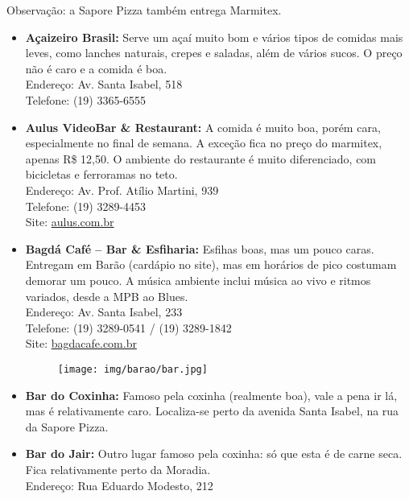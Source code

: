 Observação: a Sapore Pizza também entrega Marmitex.


%
%

\begin{itemize}
    \item   \textbf{Açaizeiro Brasil:} Serve um açaí muito bom e vários tipos de
        comidas mais leves, como lanches naturais, crepes e saladas, além de
        vários sucos. O preço não é caro e a comida é boa.
        \\Endereço: Av. Santa Isabel, 518
        \\Telefone: (19) 3365-6555 %

    \item   \textbf{Aulus VideoBar \& Restaurant:} A comida é muito boa, porém
        cara, especialmente no final de semana. A exceção fica no preço do
        marmitex, apenas R\$ 12,50. O ambiente do restaurante é muito diferenciado,
        com bicicletas e ferroramas no teto.
        \\Endereço: Av. Prof. Atílio Martini, 939
        \\Telefone: (19) 3289-4453
        \\Site: \url{aulus.com.br}

    \item   \textbf{Bagdá Café -- Bar \& Esfiharia:} Esfihas boas, mas um pouco
        caras. Entregam em Barão (cardápio no site), mas em horários de pico
        costumam demorar um pouco. A música ambiente inclui música ao vivo e
        ritmos variados, desde a MPB ao Blues.
        \\Endereço: Av. Santa Isabel, 233
        \\Telefone: (19) 3289-0541 / (19) 3289-1842
        \\Site: \url{bagdacafe.com.br}

\begin{figure}[h!]
    \centering
    \texttt{[image: img/barao/bar.jpg]}
\end{figure}

    \item   \textbf{Bar do Coxinha:} Famoso pela coxinha (realmente boa), vale a
        pena ir lá, mas é relativamente caro. Localiza-se perto da avenida Santa
        Isabel, na rua da Sapore Pizza.

    \item   \textbf{Bar do Jair:} Outro lugar famoso pela coxinha: só que esta é
        de carne seca. Fica relativamente perto da Moradia.
        \\Endereço: Rua Eduardo Modesto, 212


\end{itemize}
